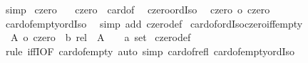\begin{isabellebody}
\ simp%
\endisatagproof
{\isafoldproof}%
%
\isadelimproof
%
\endisadelimproof
%
\isadelimdocument
%
\endisadelimdocument
%
\isatagdocument
%
\isamarkuptrue%
%
\endisatagdocument
{\isafolddocument}%
%
\isadelimdocument
%
\endisadelimdocument
{}\isamarkupfalse%
\ czero\ \isanewline
\ \ {\isachardoublequoteopen}czero\ {\isacharequal}{\kern0pt}\ card{\isacharunderscore}{\kern0pt}of\ {\isacharbraceleft}{\kern0pt}{\isacharbraceright}{\kern0pt}{\isachardoublequoteclose}\isanewline
\isanewline
{}\isamarkupfalse%
\ czero{\isacharunderscore}{\kern0pt}ordIso{\isacharcolon}{\kern0pt}\isanewline
\ \ {\isachardoublequoteopen}czero\ {\isacharequal}{\kern0pt}o\ czero{\isachardoublequoteclose}\isanewline
%
\isadelimproof
%
\endisadelimproof
%
\isatagproof
{}\isamarkupfalse%
\ card{\isacharunderscore}{\kern0pt}of{\isacharunderscore}{\kern0pt}empty{\isacharunderscore}{\kern0pt}ordIso\ \isamarkupfalse%
\ {\isacharparenleft}{\kern0pt}simp\ add{\isacharcolon}{\kern0pt}\ czero{\isacharunderscore}{\kern0pt}def{\isacharparenright}{\kern0pt}%
\endisatagproof
{\isafoldproof}%
%
\isadelimproof
\isanewline
%
\endisadelimproof
\isanewline
{}\isamarkupfalse%
\ card{\isacharunderscore}{\kern0pt}of{\isacharunderscore}{\kern0pt}ordIso{\isacharunderscore}{\kern0pt}czero{\isacharunderscore}{\kern0pt}iff{\isacharunderscore}{\kern0pt}empty{\isacharcolon}{\kern0pt}\isanewline
\ \ {\isachardoublequoteopen}{\isacharbar}{\kern0pt}A{\isacharbar}{\kern0pt}\ {\isacharequal}{\kern0pt}o\ {\isacharparenleft}{\kern0pt}czero\ {\isacharcolon}{\kern0pt}{\isacharcolon}{\kern0pt}\ {\isacharprime}{\kern0pt}b\ rel{\isacharparenright}{\kern0pt}\ {\isasymlongleftrightarrow}\ A\ {\isacharequal}{\kern0pt}\ {\isacharparenleft}{\kern0pt}{\isacharbraceleft}{\kern0pt}{\isacharbraceright}{\kern0pt}\ {\isacharcolon}{\kern0pt}{\isacharcolon}{\kern0pt}\ {\isacharprime}{\kern0pt}a\ set{\isacharparenright}{\kern0pt}{\isachardoublequoteclose}\isanewline
%
\isadelimproof
%
\endisadelimproof
%
\isatagproof
{}\isamarkupfalse%
\ czero{\isacharunderscore}{\kern0pt}def\ \isamarkupfalse%
\ {\isacharparenleft}{\kern0pt}rule\ iffI{\isacharbrackleft}{\kern0pt}OF\ card{\isacharunderscore}{\kern0pt}of{\isacharunderscore}{\kern0pt}empty{}{\isacharbrackright}{\kern0pt}{\isacharparenright}{\kern0pt}\ {\isacharparenleft}{\kern0pt}auto\ simp{\isacharcolon}{\kern0pt}\ card{\isacharunderscore}{\kern0pt}of{\isacharunderscore}{\kern0pt}refl\ card{\isacharunderscore}{\kern0pt}of{\isacharunderscore}{\kern0pt}empty{\isacharunderscore}{\kern0pt}ordIso{\isacharparenright}{\kern0pt}%

\end{isabellebody}
